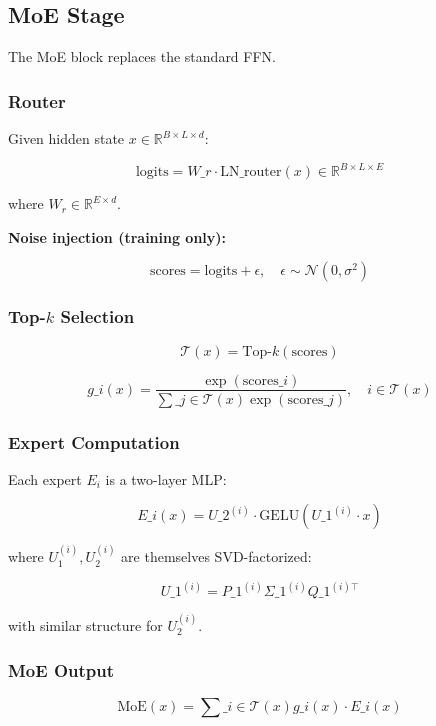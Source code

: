 \subsection{MoE Stage}

The MoE block replaces the standard FFN.

\subsubsection{Router}

Given hidden state $x \in \mathbb{R}^{B \times L \times d}$:

\[
\text{logits} = W\_r \cdot \text{LN}\_\text{router}(x) \in \mathbb{R}^{B \times L \times E}
\tag{4.4}
\]

where $W_r \in \mathbb{R}^{E \times d}$.

\textbf{Noise injection (training only):}

\[
\text{scores} = \text{logits} + \epsilon, \quad \epsilon \sim \mathcal{N}(0, \sigma^2)
\tag{4.5}
\]

\subsubsection{Top-$k$ Selection}

\[
\mathcal{T}(x) = \text{Top-}k(\text{scores})
\tag{4.6}
\]

\[
g\_i(x) = \frac{\exp(\text{scores}\_i)}{\sum\_{j \in \mathcal{T}(x)} \exp(\text{scores}\_j)}, \quad i \in \mathcal{T}(x)
\tag{4.7}
\]

\subsubsection{Expert Computation}

Each expert $E_i$ is a two-layer MLP:

\[
E\_i(x) = U\_2^{(i)} \cdot \text{GELU}(U\_1^{(i)} \cdot x)
\tag{4.8}
\]

where $U_1^{(i)}, U_2^{(i)}$ are themselves SVD-factorized:

\[
U\_1^{(i)} = P\_1^{(i)} \Sigma\_1^{(i)} Q\_1^{(i)\top}
\tag{4.9}
\]

with similar structure for $U_2^{(i)}$.

\subsubsection{MoE Output}

\[
\text{MoE}(x) = \sum\_{i \in \mathcal{T}(x)} g\_i(x) \cdot E\_i(x)
\tag{4.10}
\]

